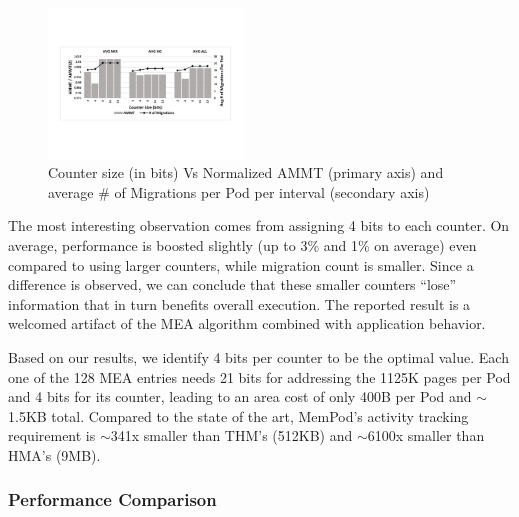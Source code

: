 \begin{figure}[h]
  \includegraphics[width=0.46\textwidth]{figures/counter_size_normalized.pdf}
  \caption{Counter size (in bits) Vs Normalized AMMT (primary axis) and average \# of Migrations per Pod per interval (secondary axis)}
  \label{fig:counter_size}
\end{figure}

The most interesting observation comes from assigning 4 bits to each counter. On average, performance is boosted slightly (up to 3\% and 1\% on average) even compared to using larger counters, while migration count is smaller. Since a difference is observed, we can conclude that these smaller counters ``lose'' information that in turn benefits overall execution. The reported result is a welcomed artifact of the MEA algorithm combined with application behavior. 

Based on our results, we identify 4 bits per counter to be the optimal value. Each one of the 128 MEA entries needs 21 bits for addressing the 1125K pages per Pod and 4 bits for its counter, leading to an area cost of only 400B per Pod and $\sim$1.5KB total. Compared to the state of the art, MemPod's activity tracking requirement is $\sim$341x smaller than THM's (512KB) and $\sim$6100x smaller than HMA's (9MB).


\subsubsection{Performance Comparison}
\label{sub:performance}

